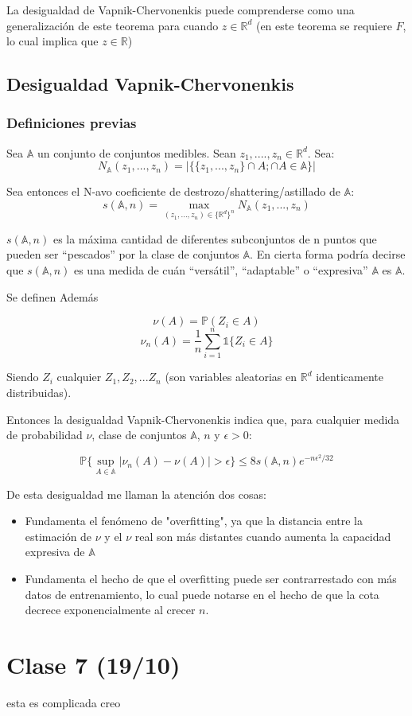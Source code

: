 \documentclass[12pt, a4paper]{article}
\begin{document}
La desigualdad de Vapnik-Chervonenkis puede comprenderse como una generalización de este teorema para cuando $z \in \mathds{R}^d$ (en este teorema se requiere $F$, lo cual implica que $z \in \mathds{R}$)

\subsection{Desigualdad Vapnik-Chervonenkis}
\subsubsection{Definiciones previas}
Sea $\mathds{A}$ un conjunto de conjuntos medibles. Sean $z_1, ...., z_n \in \mathds{R}^d$. Sea:
$$ N_{\mathds{A}}(z_1, ..., z_n)=\bigg | \big \{ \{ z_1, ..., z_n\} \cap A; \cap A \in \mathds{A} \big \} \bigg | $$

Sea entonces el N-avo coeficiente de destrozo/shattering/astillado de $\mathds{A}$:
$$ s(\mathds{A},n) = \mathop{max}_{(z_1,...,z_n) \in \{ \mathds{R}^d \}^n} N_{\mathds{A}}(z_1, ..., z_n)$$

$ s(\mathds{A},n)$ es la máxima cantidad de diferentes subconjuntos de n puntos que pueden ser ``pescados'' por la clase de conjuntos $\mathds{A}$. En cierta forma podría decirse que $ s(\mathds{A},n)$ es una medida de cuán ``versátil'', ``adaptable'' o ``expresiva'' $\mathds{A}$ es $\mathds{A}$.

Se definen Además

$$\nu(A)=\mathds{P}(Z_i \in A)$$
$$\nu_n(A)=\frac{1}{n} \sum_{i=1}^n \mathds{1} \{ Z_i \in A \}$$

Siendo $Z_i$ cualquier $Z_1, Z_2,... Z_n$ (son variables aleatorias en $ \mathds{R}^d $ identicamente distribuidas).

Entonces la desigualdad Vapnik-Chervonenkis indica que, para cualquier medida de probabilidad $\nu$, clase de conjuntos $\mathds{A}$, $n$ y $\epsilon>0$:

$$ \mathds{P} \big \{ \mathop{sup}_{A\in \mathds{A}} | \nu_n(A) - \nu(A) | > \epsilon \big \} \leq 8 s(\mathds{A},n)e^{-n\epsilon^2 / 32} $$

De esta desigualdad me llaman la atención dos cosas:
\begin{itemize}
  \item Fundamenta el fenómeno de "overfitting", ya que la distancia entre la estimación de $\nu$ y el $\nu$ real son más distantes cuando aumenta la capacidad expresiva de $\mathds{A}$
  \item Fundamenta el hecho de que el overfitting puede ser contrarrestado con más datos de entrenamiento, lo cual puede notarse en el hecho de que la cota decrece exponencialmente al crecer $n$.
\end{itemize}

\section{Clase 7 (19/10)}
esta es complicada creo
\end{document}
